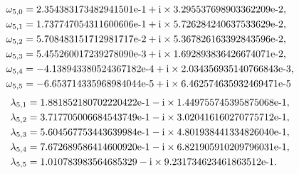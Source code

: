 \documentclass[12pt]{article}
\def\i{{\textnormal i}}
\theoremstyle{definition}
\begin{document}
 { \small
  \begingroup
\addtolength{\jot}{-0.2em}

\begin{align*}
\omega_{5,0}&=2.354383173482941501\text{\text{e-}}1+\i \times   3.295537698903362209\text{\text{e-}}2,\\
\omega_{5,1}&=1.737747054311600606\text{e-}1+\i \times   5.726284240637533629\text{e-}2, \\
\omega_{5,2}&=5.708483151712981717\text{e-}2+\i \times   5.367826163392843596\text{e-}2, \\
\omega_{5,3}&=5.455260017239278090\text{e-}3+\i \times    1.692893836426674071\text{e-}2, \\ 
\omega_{5,4}&=-4.138943380524367182\text{e-}4+\i \times    2.034356935140766843\text{e-}3, \\
\omega_{5,5}&=-6.653714335968984044\text{e-}5+\i \times    6.462574635932469471\text{e-}5       
    \end{align*}            
\begin{align*}
\lambda_{5,1}&=1.881852180702220422\text{e-}1-\i \times    1.449755745395875068\text{e-}1 , \\
\lambda_{5,2}&=3.717705006684543749\text{e-}1 -\i \times    3.020416160270775712\text{e-}1, \\
\lambda_{5,3}&=5.604567753443639984\text{e-}1-\i \times    4.801938441334826040\text{e-}1 , \\ 
\lambda_{5,4}&=7.672689586414600920\text{e-}1-\i \times     6.821905910209796031\text{e-}1 , \\
\lambda_{5,5}&= 1.010783983564685329-\i \times     9.231734623461863512\text{e-}1.       
    \end{align*}     
        
              
               

}
\end{document}
